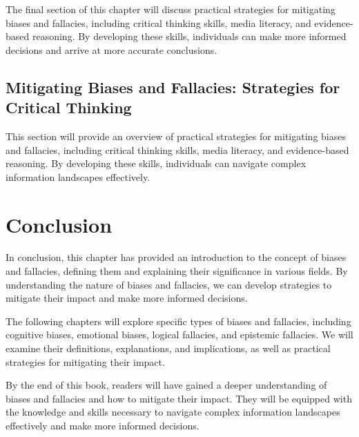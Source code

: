 The final section of this chapter will discuss practical strategies for mitigating biases and fallacies, including critical thinking skills, media literacy, and evidence-based reasoning. By developing these skills, individuals can make more informed decisions and arrive at more accurate conclusions.

\section{Mitigating Biases and Fallacies: Strategies for Critical Thinking}

This section will provide an overview of practical strategies for mitigating biases and fallacies, including critical thinking skills, media literacy, and evidence-based reasoning. By developing these skills, individuals can navigate complex information landscapes effectively.

\chapter{Conclusion}

In conclusion, this chapter has provided an introduction to the concept of biases and fallacies, defining them and explaining their significance in various fields. By understanding the nature of biases and fallacies, we can develop strategies to mitigate their impact and make more informed decisions.

The following chapters will explore specific types of biases and fallacies, including cognitive biases, emotional biases, logical fallacies, and epistemic fallacies. We will examine their definitions, explanations, and implications, as well as practical strategies for mitigating their impact.

By the end of this book, readers will have gained a deeper understanding of biases and fallacies and how to mitigate their impact. They will be equipped with the knowledge and skills necessary to navigate complex information landscapes effectively and make more informed decisions.
